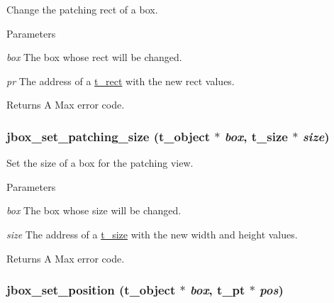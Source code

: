 Change the patching rect of a box. 
\begin{DoxyParams}{Parameters}
\item[{\em box}]The box whose rect will be changed. \item[{\em pr}]The address of a \hyperlink{structt__rect}{t\_\-rect} with the new rect values. \end{DoxyParams}
\begin{DoxyReturn}{Returns}
A Max error code. 
\end{DoxyReturn}
\hypertarget{group__jbox_gab7eb5fa0028078fa1665c255ede79cf5}{
\subsubsection[{jbox\_\-set\_\-patching\_\-size}]{ jbox\_\-set\_\-patching\_\-size ({\bf t\_\-object} $\ast$ {\em box}, \/  {\bf t\_\-size} $\ast$ {\em size})}}
\label{group__jbox_gab7eb5fa0028078fa1665c255ede79cf5}


Set the size of a box for the patching view. 
\begin{DoxyParams}{Parameters}
\item[{\em box}]The box whose size will be changed. \item[{\em size}]The address of a \hyperlink{structt__size}{t\_\-size} with the new width and height values. \end{DoxyParams}
\begin{DoxyReturn}{Returns}
A Max error code. 
\end{DoxyReturn}
\hypertarget{group__jbox_gae1901dd9922577bb4bcc33665dd4e7f6}{
\subsubsection[{jbox\_\-set\_\-position}]{ jbox\_\-set\_\-position ({\bf t\_\-object} $\ast$ {\em box}, \/  {\bf t\_\-pt} $\ast$ {\em pos})}}
\label{group__jbox_gae1901dd9922577bb4bcc33665dd4e7f6}


